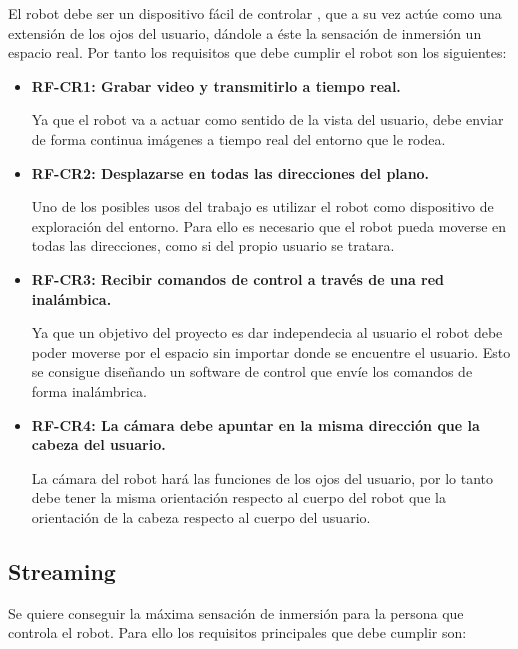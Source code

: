 \documentclass[twoside, 11pt]{epstfg}
\begin{document}
El robot debe ser un dispositivo fácil de controlar , que a su vez actúe como una extensión de los ojos del usuario, dándole a éste la sensación de inmersión un espacio real.
Por tanto los requisitos que debe cumplir el robot son los siguientes:


\begin{itemize}
	\item \textbf{RF-CR1: Grabar video y transmitirlo a tiempo real.}
	
	 Ya que el robot va a actuar como sentido de la vista del usuario, debe enviar de forma continua imágenes a tiempo real del entorno que le rodea.
	
	
	\item\textbf{RF-CR2: Desplazarse en todas las direcciones del plano.} 
	
	Uno de los posibles usos del trabajo es utilizar el robot como dispositivo de exploración del entorno. Para ello es necesario que el robot pueda moverse en todas las direcciones, como si del propio usuario se tratara.
	
	
	\item\textbf{RF-CR3: Recibir comandos de control a través de una red inalámbica.}
	
	Ya que un objetivo del proyecto es dar independecia al usuario el robot debe poder moverse por el espacio sin importar donde se encuentre el usuario. Esto se consigue diseñando un software de control que envíe los comandos de forma inalámbrica.
	
	
	\item\textbf{RF-CR4: La cámara debe apuntar en la misma dirección que la cabeza del usuario.} \label{RF-CR4} 
	
	La cámara del robot hará las funciones de los ojos del usuario, por lo tanto debe tener la misma orientación respecto al cuerpo del robot que la orientación de la cabeza respecto al cuerpo del usuario.
\end{itemize}



\subsection{Streaming}
Se quiere conseguir la máxima sensación de inmersión para la persona que controla el robot.
Para ello los requisitos principales que debe cumplir son:
\end{document}
